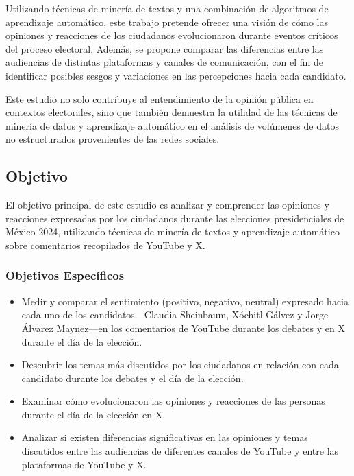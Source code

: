 \documentclass[10pt, a4paper]{article}
\begin{document}
	Utilizando técnicas de minería de textos y una combinación de algoritmos de aprendizaje automático, este trabajo pretende ofrecer una visión de cómo las opiniones y reacciones de los ciudadanos evolucionaron durante eventos críticos del proceso electoral. Además, se propone comparar las diferencias entre las audiencias de distintas plataformas y canales de comunicación, con el fin de identificar posibles sesgos y variaciones en las percepciones hacia cada candidato.
	
	Este estudio no solo contribuye al entendimiento de la opinión pública en contextos electorales, sino que también demuestra la utilidad de las técnicas de minería de datos y aprendizaje automático en el análisis de volúmenes de datos no estructurados provenientes de las redes sociales.
	
	\subsection{Objetivo}
	El objetivo principal de este estudio es analizar y comprender las opiniones y reacciones expresadas por los ciudadanos durante las elecciones presidenciales de México 2024, utilizando técnicas de minería de textos y aprendizaje automático sobre comentarios recopilados de YouTube y X. 
	
	\subsubsection{Objetivos Específicos}
	\begin{itemize}
		\item Medir y comparar el sentimiento (positivo, negativo, neutral) expresado hacia cada uno de los candidatos—Claudia Sheinbaum, Xóchitl Gálvez y Jorge Álvarez Maynez—en los comentarios de YouTube durante los debates y en X durante el día de la elección.
		\item  Descubrir los temas más discutidos por los ciudadanos en relación con cada candidato durante los debates y el día de la elección.
		\item Examinar cómo evolucionaron las opiniones y reacciones de las personas durante el día de la elección en X.
		\item Analizar si existen diferencias significativas en las opiniones y temas discutidos entre las audiencias de diferentes canales de YouTube y entre las plataformas de YouTube y X.
	\end{itemize}
	
	\vspace{10cm}
	
\end{document}
